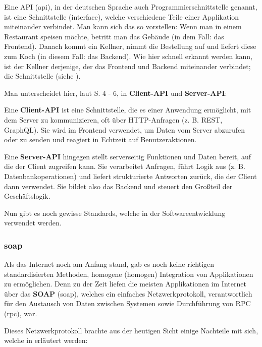 Eine API (\gls{api}), in der deutschen Sprache auch Programmierschnittstelle genannt, ist eine Schnittstelle (\gls{interface}), welche verschiedene Teile einer Applikation miteinander verbindet. Man kann sich das so vorstellen: Wenn man in einem Restaurant speisen möchte, betritt man das Gebäude (in dem Fall: das Frontend). Danach kommt ein Kellner, nimmt die Bestellung auf und liefert diese zum Koch (in diesem Fall: das Backend). Wie hier schnell erkannt werden kann, ist der Kellner derjenige, der das Frontend und Backend miteinander verbindet; die Schnittstelle (siehe \cite{book-api-development-springer}).
\newline

Man unterscheidet hier, laut \cite{book-api-development-springer} S. 4 - 6, in \textbf{Client-API} und \textbf{Server-API}:
\newline


Eine \textbf{Client-API} ist eine Schnittstelle, die es einer Anwendung ermöglicht, mit dem Server zu kommunizieren, oft über HTTP-Anfragen (z. B. REST, GraphQL). Sie wird im Frontend verwendet, um Daten vom Server abzurufen oder zu senden und reagiert in Echtzeit auf Benutzeraktionen.


Eine \textbf{Server-API} hingegen stellt serverseitig Funktionen und Daten bereit, auf die der Client zugreifen kann. Sie verarbeitet Anfragen, führt Logik aus (z. B. Datenbankoperationen) und liefert strukturierte Antworten zurück, die der Client dann verwendet. Sie bildet also das Backend und steuert den Großteil der Geschäftslogik. 

Nun gibt es noch gewisse Standards, welche in der Softwareentwicklung verwendet werden.

\subsubsection{\gls{soap}}

Als das Internet noch am Anfang stand, gab es noch keine richtigen standardisierten Methoden, homogene (\gls{homogen}) Integration von Applikationen zu ermöglichen. 
Denn zu der Zeit liefen die meisten Applikationen im Internet über das \textbf{SOAP} (\gls{soap}), welches ein einfaches Netzwerkprotokoll, verantwortlich für den Austausch von Daten zwischen Systemen sowie Durchführung von RPC (\gls{rpc}), war.

Dieses Netzwerkprotokoll brachte aus der heutigen Sicht einige Nachteile mit sich, welche in \cite{paper-soap} erläutert werden:

